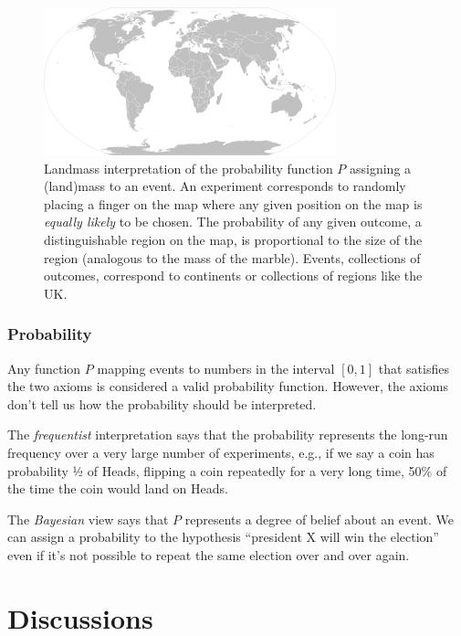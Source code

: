 \begin{figure}[h!]
\centering
\includegraphics[width=0.75\linewidth]{images/figure2.png}
\caption{%
Landmass interpretation of the probability function \(P\) assigning a (land)mass to an event.
An experiment corresponds to randomly placing a finger on the map where any given position 
on the map is \emph{equally likely} to be chosen. 
The probability of any given outcome, 
a distinguishable region on the map,
is proportional to the size of the region (analogous to the mass of the marble). 
Events, 
collections of outcomes, 
correspond to continents or collections of regions like the UK.
}
\label{fig:landmass}
\end{figure}

\subsubsection{Probability}

Any function \(P\) mapping events to numbers in the interval \([0,1]\) that satisfies the two axioms 
is considered a valid probability function. 
However, 
the axioms don't tell us how the probability should be interpreted.

The \emph{frequentist} interpretation says that the probability
represents the long-run frequency over a very large number of experiments, 
e.g., if we say a coin has probability ½ of Heads, 
flipping a coin repeatedly for a very long time, 
50\% of the time the coin would land on Heads.%

The \emph{Bayesian} view says that \(P\) represents a degree of belief about an event. 
We can assign a probability to the 
hypothesis ``president X will win the election'' even if it's not 
possible to repeat the same election over and over again.

\section{Discussions}

